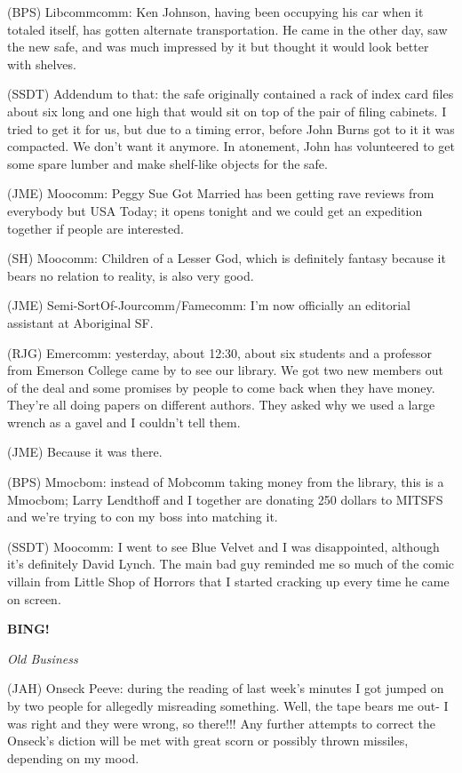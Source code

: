 \documentclass[12pt]{article}
\newcommand{\bing}{{\bf BING!} }
\newcommand{\goto}[1]{\bing \vskip 12pt \centerline{{\em{#1}}}}
\begin{document}
(BPS) Libcommcomm: Ken Johnson, having been occupying his car when it totaled itself, has gotten alternate transportation. He came in the other day, saw the new safe, and was much impressed by it but thought it would look better with shelves.

(SSDT) Addendum to that: the safe originally contained a rack of index card files about six long and one high that would sit on top of the pair of filing cabinets. I tried to get it for us, but due to a timing error, before John Burns got to it it was compacted. We don't want it anymore. In atonement, John has volunteered to get some spare lumber and make shelf-like objects for the safe.

(JME) Moocomm: Peggy Sue Got Married has been getting rave reviews from everybody but USA Today; it opens tonight and we could get an expedition together if people are interested.

(SH) Moocomm: Children of a Lesser God, which is definitely fantasy because it bears no relation to reality, is also very good.

(JME) Semi-SortOf-Jourcomm/Famecomm: I'm now officially an editorial assistant at Aboriginal SF.

(RJG) Emercomm: yesterday, about 12:30, about six students and a professor from Emerson College came by to see our library. We got two new members out of the deal and some promises by people to come back when they have money. They're all doing papers on different authors. They asked why we used a large wrench as a gavel and I couldn't tell them.

(JME) Because it was there.

(BPS) Mmocbom: instead of Mobcomm taking money from the library, this is a Mmocbom; Larry Lendthoff and I together are donating 250 dollars to MITSFS and we're trying to con my boss into matching it.

(SSDT) Moocomm: I went to see Blue Velvet and I was disappointed, although it's definitely David Lynch. The main bad guy reminded me so much of the comic villain from Little Shop of Horrors that I started cracking up every time he came on screen.

\goto{Old Business}

(JAH) Onseck Peeve: during the reading of last week's minutes I got jumped on by two people for allegedly misreading something. Well, the tape bears me out- I was right and they were wrong, so there!!! Any further attempts to correct the Onseck's diction will be met with great scorn or possibly thrown missiles, depending on my mood.
\end{document}
